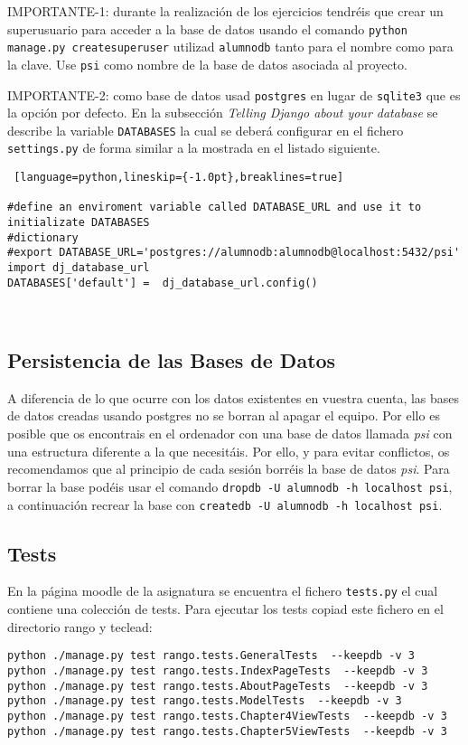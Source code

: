\documentclass[12pt]{article} %
\begin{document}
IMPORTANTE-1: durante la realización de los ejercicios tendréis que crear un superusuario para acceder a la base de datos usando el comando \texttt{python manage.py createsuperuser} utilizad \texttt{alumnodb} tanto para el nombre como para la clave. Use \texttt{psi} como nombre de la base de datos asociada al proyecto.

IMPORTANTE-2: como base de datos usad \texttt{postgres} en lugar de \texttt{sqlite3} que es
la opción por defecto. En la subsección \textit{Telling Django about your database} se describe 
la variable \texttt{DATABASES} la cual se deberá configurar en el fichero \texttt{settings.py} de forma similar a la mostrada en el listado siguiente.\\

\begin{lstlisting} [language=python,lineskip={-1.0pt},breaklines=true] 

#define an enviroment variable called DATABASE_URL and use it to initializate DATABASES
#dictionary
#export DATABASE_URL='postgres://alumnodb:alumnodb@localhost:5432/psi'
import dj_database_url
DATABASES['default'] =  dj_database_url.config()

   
\end{lstlisting}
\subsection{Persistencia de las Bases de Datos}
A diferencia de lo que ocurre con los datos existentes en vuestra cuenta, las bases de datos creadas usando postgres no se borran al apagar el equipo. Por ello es posible que os encontrais en el ordenador con una base de datos llamada \textit{psi} con una estructura diferente a la que necesitáis. Por ello, y para evitar conflictos, os recomendamos que al principio de cada sesión borréis la base de datos \textit{psi}. Para borrar la base podéis usar el comando \texttt{dropdb -U alumnodb -h localhost psi}, a continuación recrear la base con \texttt{createdb -U alumnodb -h localhost psi}.

\subsection{Tests}
En la página moodle de la asignatura se encuentra el fichero \texttt{tests.py} el cual contiene una colección de tests. Para ejecutar los tests copiad este fichero en el directorio rango y teclead:
\begin{verbatim}
python ./manage.py test rango.tests.GeneralTests  --keepdb -v 3
python ./manage.py test rango.tests.IndexPageTests  --keepdb -v 3
python ./manage.py test rango.tests.AboutPageTests  --keepdb -v 3
python ./manage.py test rango.tests.ModelTests  --keepdb -v 3
python ./manage.py test rango.tests.Chapter4ViewTests  --keepdb -v 3
python ./manage.py test rango.tests.Chapter5ViewTests  --keepdb -v 3
\end{verbatim}
\end{document}
